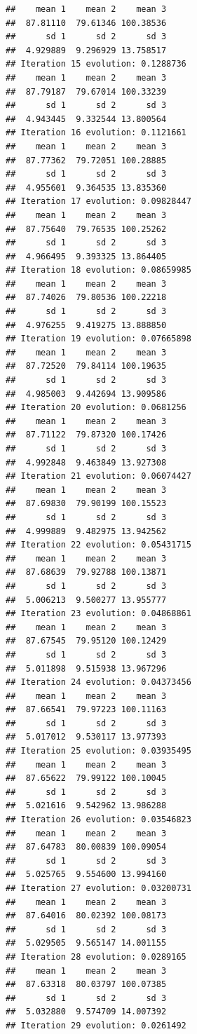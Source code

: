 \documentclass[
]{article}
\begin{document}
\begin{verbatim}
##    mean 1    mean 2    mean 3 
##  87.81110  79.61346 100.38536 
##      sd 1      sd 2      sd 3 
##  4.929889  9.296929 13.758517 
## Iteration 15 evolution: 0.1288736 
##    mean 1    mean 2    mean 3 
##  87.79187  79.67014 100.33239 
##      sd 1      sd 2      sd 3 
##  4.943445  9.332544 13.800564 
## Iteration 16 evolution: 0.1121661 
##    mean 1    mean 2    mean 3 
##  87.77362  79.72051 100.28885 
##      sd 1      sd 2      sd 3 
##  4.955601  9.364535 13.835360 
## Iteration 17 evolution: 0.09828447 
##    mean 1    mean 2    mean 3 
##  87.75640  79.76535 100.25262 
##      sd 1      sd 2      sd 3 
##  4.966495  9.393325 13.864405 
## Iteration 18 evolution: 0.08659985 
##    mean 1    mean 2    mean 3 
##  87.74026  79.80536 100.22218 
##      sd 1      sd 2      sd 3 
##  4.976255  9.419275 13.888850 
## Iteration 19 evolution: 0.07665898 
##    mean 1    mean 2    mean 3 
##  87.72520  79.84114 100.19635 
##      sd 1      sd 2      sd 3 
##  4.985003  9.442694 13.909586 
## Iteration 20 evolution: 0.0681256 
##    mean 1    mean 2    mean 3 
##  87.71122  79.87320 100.17426 
##      sd 1      sd 2      sd 3 
##  4.992848  9.463849 13.927308 
## Iteration 21 evolution: 0.06074427 
##    mean 1    mean 2    mean 3 
##  87.69830  79.90199 100.15523 
##      sd 1      sd 2      sd 3 
##  4.999889  9.482975 13.942562 
## Iteration 22 evolution: 0.05431715 
##    mean 1    mean 2    mean 3 
##  87.68639  79.92788 100.13871 
##      sd 1      sd 2      sd 3 
##  5.006213  9.500277 13.955777 
## Iteration 23 evolution: 0.04868861 
##    mean 1    mean 2    mean 3 
##  87.67545  79.95120 100.12429 
##      sd 1      sd 2      sd 3 
##  5.011898  9.515938 13.967296 
## Iteration 24 evolution: 0.04373456 
##    mean 1    mean 2    mean 3 
##  87.66541  79.97223 100.11163 
##      sd 1      sd 2      sd 3 
##  5.017012  9.530117 13.977393 
## Iteration 25 evolution: 0.03935495 
##    mean 1    mean 2    mean 3 
##  87.65622  79.99122 100.10045 
##      sd 1      sd 2      sd 3 
##  5.021616  9.542962 13.986288 
## Iteration 26 evolution: 0.03546823 
##    mean 1    mean 2    mean 3 
##  87.64783  80.00839 100.09054 
##      sd 1      sd 2      sd 3 
##  5.025765  9.554600 13.994160 
## Iteration 27 evolution: 0.03200731 
##    mean 1    mean 2    mean 3 
##  87.64016  80.02392 100.08173 
##      sd 1      sd 2      sd 3 
##  5.029505  9.565147 14.001155 
## Iteration 28 evolution: 0.0289165 
##    mean 1    mean 2    mean 3 
##  87.63318  80.03797 100.07385 
##      sd 1      sd 2      sd 3 
##  5.032880  9.574709 14.007392 
## Iteration 29 evolution: 0.0261492 

\end{verbatim}
\end{document}
